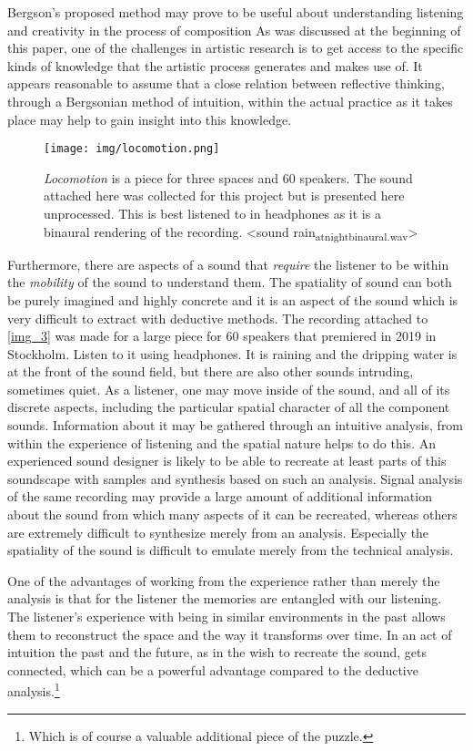 \documentclass[11pt]{article}
\begin{document}
Bergson's proposed method may prove to be useful about understanding listening and creativity in the process of composition
As was discussed at the beginning of this paper, one of the challenges in artistic research is to get access to the specific kinds of knowledge that the artistic process generates and makes use of. It appears reasonable to assume that a close relation between reflective thinking, through a Bergsonian method of intuition, within the actual practice as it takes place may help to gain insight into this knowledge.

\begin{figure}[htbp]
\centering
\texttt{[image: img/locomotion.png]}
\caption{\label{fig:orgb3c84ce}\emph{Locomotion} is a piece for three spaces and 60 speakers. The sound attached here was collected for this project but is presented here unprocessed. This is best listened to in headphones as it is a binaural rendering of the recording.  <sound rain\textsubscript{at}\textsubscript{night}\textsubscript{binaural.wav}>}
\end{figure}

Furthermore, there are aspects of a sound that \emph{require} the listener to be within the \emph{mobility} of the sound to understand them. The spatiality of sound can both be purely imagined and highly concrete and it is an aspect of the sound which is very difficult to extract with deductive methods. The recording attached to \ref{img_3} was made for a large piece for 60 speakers that premiered in 2019 in Stockholm. Listen to it using headphones. It is raining and the dripping water is at the front of the sound field, but there are also other sounds intruding, sometimes quiet.
As a listener, one may move inside of the sound, and all of its discrete aspects, including the particular spatial character of all the component sounds.
Information about it may be gathered through an intuitive analysis, from within the experience of listening and the spatial nature helps to do this.
An experienced sound designer is likely to be able to recreate at least parts of this soundscape with samples and synthesis based on such an analysis.
Signal analysis of the same recording may provide a large amount of additional information about the sound from which many aspects of it can be recreated, whereas others are extremely difficult to synthesize merely from an analysis.
Especially the spatiality of the sound is difficult to emulate merely from the technical analysis.

One of the advantages of working from the experience rather than merely the analysis is that for the listener the memories are entangled with our listening.
The listener's experience with being in similar environments in the past allows them to reconstruct the space and the way it transforms over time.
In an act of intuition the past and the future, as in the wish to recreate the sound, gets connected, which can be a powerful advantage compared to the deductive analysis.\footnote{Which is of course a valuable additional piece of the puzzle.} 
\end{document}
